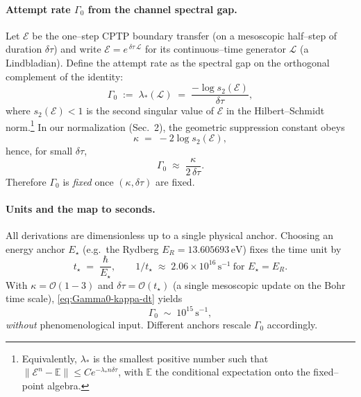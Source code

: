 \documentclass[11pt]{article}
\theoremstyle{plain}
\theoremstyle{definition}
\begin{document}
\paragraph{Attempt rate $\Gamma_0$ from the channel spectral gap.}
Let $\mathcal{E}$ be the one–step CPTP boundary transfer (on a mesoscopic half–step of duration $\delta\tau$) and write
$\mathcal{E}=e^{\,\delta\tau\,\mathcal{L}}$ for its continuous–time generator $\mathcal{L}$ (a Lindbladian).
Define the attempt rate as the spectral gap on the orthogonal complement of the identity:
\begin{equation}\label{eq:Gamma0-def}
  \Gamma_0 \;:=\; \lambda_\ast(\mathcal{L})
  \;=\; \frac{-\log s_2(\mathcal{E})}{\delta\tau},
\end{equation}
where $s_2(\mathcal{E})<1$ is the second singular value of $\mathcal{E}$ in the Hilbert–Schmidt norm.\footnote{Equivalently, $\lambda_\ast$ is the smallest positive number such that $\| \mathcal{E}^n - \mathbb{E}\| \le C e^{-\lambda_\ast n \delta\tau}$, with $\mathbb{E}$ the conditional expectation onto the fixed–point algebra.}
In our normalization (Sec.~2), the geometric suppression constant obeys
\[
  \kappa \;=\; -2\log s_2(\mathcal{E}),
\]
hence, for small $\delta\tau$,
\begin{equation}\label{eq:Gamma0-kappa-dt}
  \Gamma_0 \;\approx\; \frac{\kappa}{2\,\delta\tau}.
\end{equation}
Therefore $\Gamma_0$ is \emph{fixed} once $(\kappa,\delta\tau)$ are fixed.

\paragraph{Units and the map to seconds.}
All derivations are dimensionless up to a single physical anchor. Choosing an energy anchor $E_\star$ (e.g.\ the Rydberg $E_R=13.605693\,\mathrm{eV}$) fixes the time unit by
\[
  t_\star \;=\; \frac{\hbar}{E_\star}, \qquad 1/t_\star \;\approx\; 2.06\times 10^{16}\,\mathrm{s^{-1}}\ \text{for }E_\star=E_R.
\]
With $\kappa=\mathcal{O}(1\!-\!3)$ and $\delta\tau=\mathcal{O}(t_\star)$ (a single mesoscopic update on the Bohr time scale), \eqref{eq:Gamma0-kappa-dt} yields
\[
  \Gamma_0 \;\sim\; 10^{15}\,\mathrm{s^{-1}},
\]
\emph{without} phenomenological input. Different anchors rescale $\Gamma_0$ accordingly.
\end{document}
